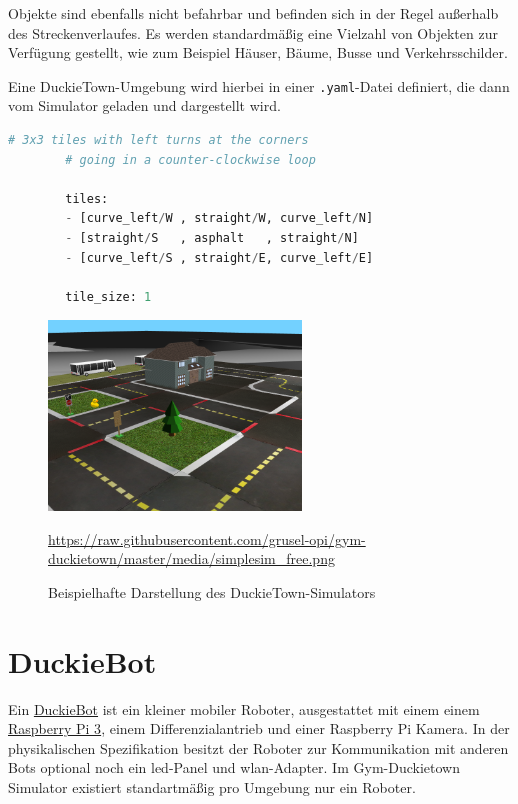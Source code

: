 Objekte sind ebenfalls nicht befahrbar und befinden sich in der Regel außerhalb des Streckenverlaufes. Es werden standardmäßig eine Vielzahl von Objekten zur Verfügung gestellt, wie zum Beispiel Häuser, Bäume, Busse und Verkehrsschilder.

Eine DuckieTown-Umgebung wird hierbei in einer \texttt{.yaml}-Datei definiert, die dann vom Simulator geladen und dargestellt wird.

\hspace{1cm}
\begin{minipage}{.73\linewidth}
	\begin{lstlisting}[caption={Beispieldefinition einer DuckieTown-Umgebung}, language=python]
		# 3x3 tiles with left turns at the corners
		# going in a counter-clockwise loop
	
		tiles:
		- [curve_left/W , straight/W, curve_left/N]
		- [straight/S   , asphalt   , straight/N]
		- [curve_left/S , straight/E, curve_left/E]
	
		tile_size: 1
	\end{lstlisting}
\end{minipage}


\begin{figure}[H]
	\centering
	\includegraphics[width=0.6\textwidth]{kapitel2/images/duckietown-gym.png}
	\label{fig:duckietown-gym}
	\caption{Beispielhafte Darstellung des DuckieTown-Simulators}
	\vspace{0.2cm}
	\quelle\url{https://raw.githubusercontent.com/grusel-opi/gym-duckietown/master/media/simplesim_free.png}
\end{figure}

\section{DuckieBot}
\label{duckiebot}

Ein \href{https://get.duckietown.com/products/duckiebot-db18}{DuckieBot} ist ein kleiner mobiler Roboter, ausgestattet mit einem einem \href{https://www.raspberrypi.org/}{Raspberry Pi 3}, einem Differenzialantrieb und einer Raspberry Pi Kamera.
In der physikalischen Spezifikation besitzt der Roboter zur Kommunikation mit anderen Bots optional noch ein \acs{led}-Panel und \acs{wlan}-Adapter.
Im Gym-Duckietown Simulator existiert standartmäßig pro Umgebung nur ein Roboter.

